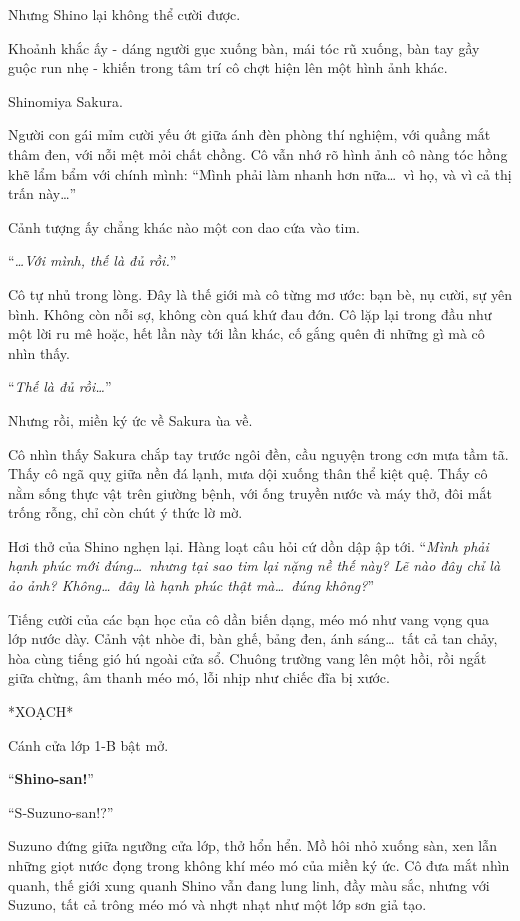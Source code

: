 \documentclass[../main.tex]{subfiles}
\begin{document}
Nhưng Shino lại không thể cười được.

Khoảnh khắc ấy - dáng người gục xuống bàn, mái tóc rũ xuống, bàn tay gầy guộc run nhẹ - khiến trong tâm trí cô chợt hiện lên một hình ảnh khác.

Shinomiya Sakura.

Người con gái mỉm cười yếu ớt giữa ánh đèn phòng thí nghiệm, với quầng mắt thâm đen, với nỗi mệt mỏi chất chồng. Cô vẫn nhớ rõ hình ảnh cô nàng tóc hồng khẽ lẩm bẩm với chính mình: ``Mình phải làm nhanh hơn nữa\dots\ vì họ, và vì cả thị trấn này\dots''

Cảnh tượng ấy chẳng khác nào một con dao cứa vào tim.

``\textit{\dots Với mình, thế là đủ rồi.}''

Cô tự nhủ trong lòng. Đây là thế giới mà cô từng mơ ước: bạn bè, nụ cười, sự yên bình. Không còn nỗi sợ, không còn quá khứ đau đớn. Cô lặp lại trong đầu như một lời ru mê hoặc, hết lần này tới lần khác, cố gắng quên đi những gì mà cô nhìn thấy.

``\textit{Thế là đủ rồi\dots}''

Nhưng rồi, miền ký ức về Sakura ùa về.

Cô nhìn thấy Sakura chắp tay trước ngôi đền, cầu nguyện trong cơn mưa tầm tã. Thấy cô ngã quỵ giữa nền đá lạnh, mưa dội xuống thân thể kiệt quệ. Thấy cô nằm sống thực vật trên giường bệnh, với ống truyền nước và máy thở, đôi mắt trống rỗng, chỉ còn chút ý thức lờ mờ.

Hơi thở của Shino nghẹn lại. Hàng loạt câu hỏi cứ dồn dập ập tới. ``\textit{Mình phải hạnh phúc mới đúng\dots\ nhưng tại sao tim lại nặng nề thế này? Lẽ nào đây chỉ là ảo ảnh? Không\dots\ đây là hạnh phúc thật mà\dots\ đúng không?}''

Tiếng cười của các bạn học của cô dần biến dạng, méo mó như vang vọng qua lớp nước dày. Cảnh vật nhòe đi, bàn ghế, bảng đen, ánh sáng\dots\ tất cả tan chảy, hòa cùng tiếng gió hú ngoài cửa sổ. Chuông trường vang lên một hồi, rồi ngắt giữa chừng, âm thanh méo mó, lỗi nhịp như chiếc đĩa bị xước.

*XOẠCH*

Cánh cửa lớp 1-B bật mở.

``\textbf{Shino-san!}''

``S-Suzuno-san!?''

Suzuno đứng giữa ngưỡng cửa lớp, thở hổn hển. Mồ hôi nhỏ xuống sàn, xen lẫn những giọt nước đọng trong không khí méo mó của miền ký ức. Cô đưa mắt nhìn quanh, thế giới xung quanh Shino vẫn đang lung linh, đầy màu sắc, nhưng với Suzuno, tất cả trông méo mó và nhợt nhạt như một lớp sơn giả tạo.
\end{document}

